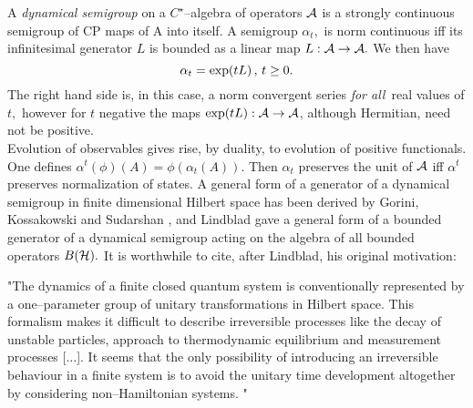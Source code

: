 \documentclass[12pt]{article}
\def\be{\begin{equation}} \def\ee{\end{equation}}
\begin{document}
A {\sl dynamical semigroup} on a $C^{\star }$--algebra of operators ${\cal A}$ 
is
a strongly continuous semigroup of CP maps of {\cal A} into
itself.  A semigroup $\alpha _t , $ is norm continuous 
iff its infinitesimal
generator $L$ is bounded as a linear map $L: {\cal A}\rightarrow {\cal A} . $
We then have \be
\alpha _t=\exp (t L) \thinspace , \thinspace t\geq 0 .  \ee
The right hand side is,  in this case,   a norm convergent series {\sl for all}\
real values of $t, $ however for $t$ negative the maps $\exp (tL): {\cal A}
\rightarrow {\cal A}$, although Hermitian, need not be positive.  \\ 
Evolution of observables
gives rise,  by duality,  to evolution of positive functionals.  One defines $
\alpha ^t (\phi ) (A)=\phi  (\alpha _t (A)). $ Then $\alpha _t$ preserves the
unit of ${\cal A}$ iff $\alpha ^t$ preserves normalization of states.  A
general form of a generator of a dynamical semigroup in finite dimensional
Hilbert space has been derived by Gorini,  Kossakowski and Sudarshan \cite
{koss},  and Lindblad \cite{lin} gave a general form of a bounded generator of
a dynamical semigroup acting on the algebra of all bounded operators ${\sl B}
 ({\cal H}). $ It is worthwhile to cite, after Lindblad, his
 original motivation:

"The dynamics of a finite closed quantum system is conventionally
represented by a one--parameter group of unitary transformations in Hilbert
space.  This formalism makes it difficult to describe irreversible processes
like the decay of unstable particles,  approach to thermodynamic equilibrium
and measurement processes [$\ldots $].  It seems that the only possibility of
introducing an irreversible behaviour in a finite system is to avoid the
unitary time development altogether by considering non--Hamiltonian systems. "
\end{document}
